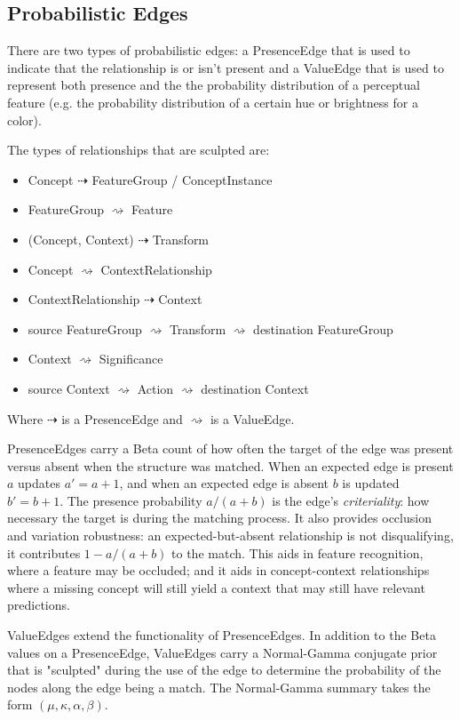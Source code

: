 \documentclass{article}
\begin{document}
\subsection{Probabilistic Edges}
There are two types of probabilistic edges: a PresenceEdge that is used to indicate that the relationship is or isn't present and a ValueEdge that is used to represent both presence and the the probability distribution of a perceptual feature (e.g. the probability distribution of a certain hue or brightness for a color).

The types of relationships that are sculpted are:
\begin{itemize}
    \item Concept $\dashrightarrow$ FeatureGroup / ConceptInstance
    \item FeatureGroup $\rightsquigarrow$ Feature
    \item (Concept, Context) $\dashrightarrow$ Transform
    \item Concept $\rightsquigarrow$ ContextRelationship
    \item ContextRelationship $\dashrightarrow$ Context
    \item source FeatureGroup $\rightsquigarrow$ Transform $\rightsquigarrow$ destination FeatureGroup
    \item Context $\rightsquigarrow$ Significance
    \item source Context $\rightsquigarrow$ Action $\rightsquigarrow$ destination Context
\end{itemize}

Where $\dashrightarrow$ is a PresenceEdge and $\rightsquigarrow$ is a ValueEdge. 

PresenceEdges carry a Beta count of how often the target of the edge was present versus absent when the structure was matched. When an expected edge is present $a$ updates $a' = a+1$, and when an expected edge is absent $b$ is updated $b' = b+1$. The presence probability $a/(a+b)$ is the edge's \emph{criteriality}: how necessary the target is during the matching process. It also provides occlusion and variation robustness: an expected-but-absent relationship is not disqualifying, it contributes $1 - a/(a+b)$ to the match. This aids in feature recognition, where a feature may be occluded; and it aids in concept-context relationships where a missing concept will still yield a context that may still have relevant predictions.

ValueEdges extend the functionality of PresenceEdges. In addition to the Beta values on a PresenceEdge, ValueEdges carry a Normal-Gamma conjugate prior that is "sculpted" during the use of the edge to determine the probability of the nodes along the edge being a match. The Normal-Gamma summary takes the form $(\mu, \kappa, \alpha, \beta)$.
\end{document}

